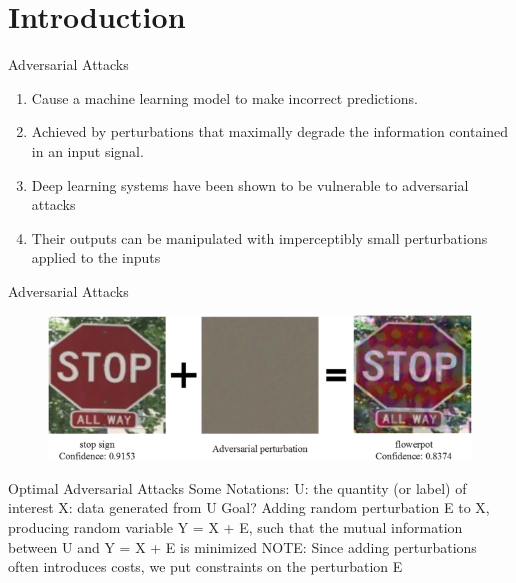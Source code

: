 \section{Introduction}

\begin{frame}{Adversarial Attacks}

\begin{enumerate}[$\Rightarrow$]
 \item Cause a machine learning model to make incorrect predictions.
  \item Achieved by perturbations that maximally degrade the information contained in an input signal.
  \pause
  \item Deep learning systems have been shown to be vulnerable to adversarial attacks
  \item Their outputs can be manipulated with imperceptibly small perturbations applied to the inputs
\end{enumerate}
\end{frame}

\begin{frame}{Adversarial Attacks}
\begin{figure}[H]
\centering
\includegraphics[width=0.8\columnwidth]{stop sign.png}
\end{figure}
\end{frame}

\begin{frame}{Optimal Adversarial Attacks}
Some Notations:
\newline
U: the quantity (or label) of interest \newline
X: data generated from U \newline
\newline
Goal?\newline
Adding random perturbation E to X, producing random variable Y = X + E, such that the mutual information between U and Y = X + E is minimized
\pause 
\newline
\newline
NOTE: Since adding perturbations often introduces costs, we put constraints on the
perturbation E
\end{frame}

